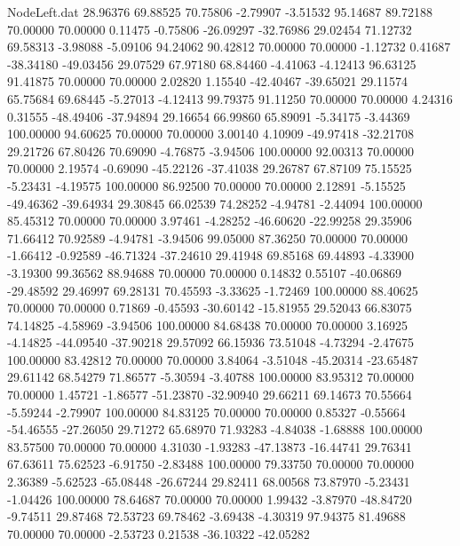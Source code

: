 \begin{filecontents}{NodeLeft.dat}
  28.96376   69.88525   70.75806    -2.79907   -3.51532   95.14687   89.72188   70.00000   70.00000    0.11475   -0.75806  -26.09297  -32.76986
  29.02454   71.12732   69.58313    -3.98088   -5.09106   94.24062   90.42812   70.00000   70.00000   -1.12732    0.41687  -38.34180  -49.03456
  29.07529   67.97180   68.84460    -4.41063   -4.12413   96.63125   91.41875   70.00000   70.00000    2.02820    1.15540  -42.40467  -39.65021
  29.11574   65.75684   69.68445    -5.27013   -4.12413   99.79375   91.11250   70.00000   70.00000    4.24316    0.31555  -48.49406  -37.94894
  29.16654   66.99860   65.89091    -5.34175   -3.44369  100.00000   94.60625   70.00000   70.00000    3.00140    4.10909  -49.97418  -32.21708
  29.21726   67.80426   70.69090    -4.76875   -3.94506  100.00000   92.00313   70.00000   70.00000    2.19574   -0.69090  -45.22126  -37.41038
  29.26787   67.87109   75.15525    -5.23431   -4.19575  100.00000   86.92500   70.00000   70.00000    2.12891   -5.15525  -49.46362  -39.64934
  29.30845   66.02539   74.28252    -4.94781   -2.44094  100.00000   85.45312   70.00000   70.00000    3.97461   -4.28252  -46.60620  -22.99258
  29.35906   71.66412   70.92589    -4.94781   -3.94506   99.05000   87.36250   70.00000   70.00000   -1.66412   -0.92589  -46.71324  -37.24610
  29.41948   69.85168   69.44893    -4.33900   -3.19300   99.36562   88.94688   70.00000   70.00000    0.14832    0.55107  -40.06869  -29.48592
  29.46997   69.28131   70.45593    -3.33625   -1.72469  100.00000   88.40625   70.00000   70.00000    0.71869   -0.45593  -30.60142  -15.81955
  29.52043   66.83075   74.14825    -4.58969   -3.94506  100.00000   84.68438   70.00000   70.00000    3.16925   -4.14825  -44.09540  -37.90218
  29.57092   66.15936   73.51048    -4.73294   -2.47675  100.00000   83.42812   70.00000   70.00000    3.84064   -3.51048  -45.20314  -23.65487
  29.61142   68.54279   71.86577    -5.30594   -3.40788  100.00000   83.95312   70.00000   70.00000    1.45721   -1.86577  -51.23870  -32.90940
  29.66211   69.14673   70.55664    -5.59244   -2.79907  100.00000   84.83125   70.00000   70.00000    0.85327   -0.55664  -54.46555  -27.26050
  29.71272   65.68970   71.93283    -4.84038   -1.68888  100.00000   83.57500   70.00000   70.00000    4.31030   -1.93283  -47.13873  -16.44741
  29.76341   67.63611   75.62523    -6.91750   -2.83488  100.00000   79.33750   70.00000   70.00000    2.36389   -5.62523  -65.08448  -26.67244
  29.82411   68.00568   73.87970    -5.23431   -1.04426  100.00000   78.64687   70.00000   70.00000    1.99432   -3.87970  -48.84720   -9.74511
  29.87468   72.53723   69.78462    -3.69438   -4.30319   97.94375   81.49688   70.00000   70.00000   -2.53723    0.21538  -36.10322  -42.05282

\end{filecontents}
